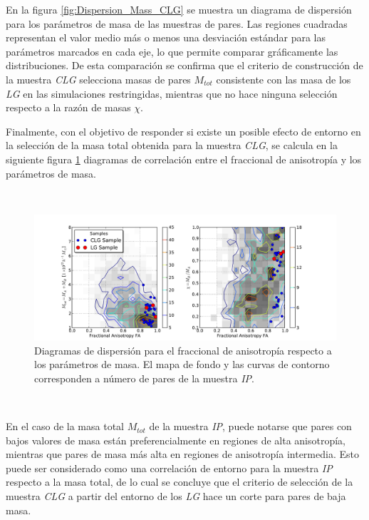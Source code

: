 En la figura \ref{fig:Dispersion_Mass_CLG} se muestra un diagrama de 
dispersión para los parámetros de masa de las muestras de pares. Las 
regiones cuadradas representan el valor medio más o menos una desviación
estándar para las parámetros marcados en cada eje, lo que permite comparar
gráficamente las distribuciones. De esta comparación se confirma que el 
criterio de construcción de la muestra \textit{CLG} selecciona masas de 
pares $M_{tot}$ consistente con las masa de los \textit{LG} en las simulaciones 
restringidas, mientras que no hace ninguna selección respecto a la razón 
de masas $\chi$.


Finalmente, con el objetivo de responder si existe un posible efecto de 
entorno en la selección de la masa total obtenida para la muestra 
\textit{CLG}, se calcula en la siguiente figura \ref{fig:CLG_FA_Mass} 
diagramas de correlación entre el fraccional de anisotropía y los parámetros 
de masa.

\
\begin{figure}[htbp]
	\centering
	\includegraphics[trim = 25mm 0mm 35mm 10mm, clip, width=1.0\textwidth]
	{./figures/4_results/CLG_FA_Mass.pdf}
	
	\caption{\small{Diagramas de dispersión para el fraccional de 
	anisotropía respecto a los parámetros de masa. El mapa de fondo y las
	curvas de contorno corresponden a número de pares de la muestra 
	\textit{IP}.}}
	\label{fig:CLG_FA_Mass}
\end{figure}
\

En el caso de la masa total $M_{tot}$ de la muestra \textit{IP}, puede 
notarse que pares con bajos valores de masa están preferencialmente en 
regiones de alta anisotropía, mientras que pares de masa más alta en 
regiones de anisotropía intermedia. Esto puede ser considerado como una 
correlación de entorno para la muestra \textit{IP} respecto a la masa total, 
de lo cual se concluye que el criterio de selección de la muestra \textit{CLG}
a partir del entorno de los \textit{LG} hace un corte para pares de baja 
masa.



